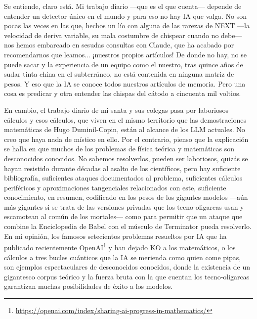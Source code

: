 \documentclass[11pt,a4paper]{article}
\begin{document}
Se entiende, claro está. Mi trabajo diario ---que es el que cuenta--- depende de entender un detector único en el mundo y para eso no hay IA que valga. No son pocas las veces en las que, hechos un lío con alguna de las rarezas de NEXT ---la velocidad de deriva variable, su mala costumbre de chispear cuando no debe--- nos hemos embarcado en sesudas consultas con Claude, que ha acabado por recomendarnos que leamos... ¡nuestros propios artículos! De donde no hay, no se puede sacar y la experiencia de un equipo como el nuestro, tras quince años de sudar tinta china en el subterráneo, no está contenida en ninguna matriz de pesos. Y eso que la IA se conoce todos nuestros artículos de memoria. Pero una cosa es predicar y otra entender las chispas del cátodo a cincuenta mil voltios.

En cambio, el trabajo diario de mi santa y sus colegas pasa por laboriosos cálculos y esos cálculos, que viven en el mismo territorio que las demostraciones matemáticas de Hugo Duminil-Copin, están al alcance de los LLM actuales. No creo que haya nada de místico en ello. Por el contrario, pienso que la explicación se halla en que muchos de los problemas de física teórica y matemáticas son desconocidos conocidos. No sabemos resolverlos, pueden ser laboriosos, quizás se hayan resistido durante décadas al asalto de los científicos, pero hay suficiente bibliografía, suficientes ataques documentados al problema, suficientes cálculos periféricos y aproximaciones tangenciales relacionados con este, suficiente conocimiento, en resumen, codificado en los pesos de los gigantes modelos ---aún más gigantes si se trata de las versiones privadas que los tecno-oligarcas usan y escamotean al común de los mortales--- como para permitir que un ataque que combine la Enciclopedia de Babel con el músculo de Terminator pueda resolverlo. En mi opinión, los famosos setecientos problemas resueltos por IA que ha publicado recientemente OpenAI\footnote{\url{https://openai.com/index/sharing-ai-progress-in-mathematics/}} y han dejado KO a los matemáticos, o los cálculos a tres bucles cuánticos que la IA se merienda como quien come pipas, son ejemplos espectaculares de desconocidos conocidos, donde la existencia de un gigantesco corpus teórico y la fuerza bruta con la que cuentan los tecno-oligarcas garantizan muchas posibilidades de éxito a los modelos.
\end{document}
